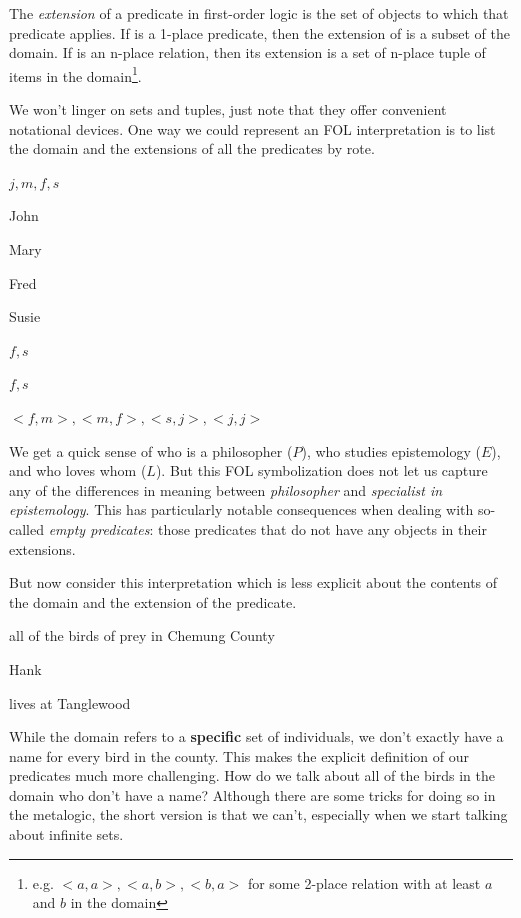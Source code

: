 \begin{definition}
  The \emph{extension} of a predicate in first-order logic is the set
  of objects to which that predicate applies. If \ebeta is a 1-place predicate,
  then the extension of \ebeta is a subset of the domain. If \ebeta is an
  n-place relation, then its extension is a set of n-place tuple of items in
  the domain\footnote{e.g. ${<a,a>,<a,b>,<b,a>}$ for some 2-place relation
  with at least $a$ and $b$ in the domain}.
\end{definition}

We won't linger on sets and tuples, just note that they offer convenient
notational devices. One way we could represent an FOL interpretation is
to list the domain and the extensions of all the predicates by rote.

\begin{argument}
  \item[\textbf{D:}] ${j,m,f,s}$
  \item[$j$:] John
  \item[$m$:] Mary
  \item[$f$:] Fred
  \item[$s$:] Susie
  \item[$P$:] ${f,s}$
  \item[$E$:] ${f,s}$
  \item[$L$:] ${<f,m>,<m,f>,<s,j>,<j,j>}$
\end{argument}

We get a quick sense of who is a philosopher ($P$), who studies epistemology
($E$), and who loves whom ($L$). But this FOL symbolization does not let us
capture any of the differences in meaning between \emph{philosopher} and
\emph{specialist in epistemology}. This has particularly notable consequences
when dealing with so-called \emph{empty predicates}: those predicates that do
not have any objects in their extensions.

But now consider this interpretation which is less explicit about the contents
of the domain and the extension of the predicate.

\begin{argument}
  \item[\textbf{D:}] all of the birds of prey in Chemung County
  \item[$h$:] Hank
  \item[$T$:] lives at Tanglewood
\end{argument}

While the domain refers to a \textbf{specific} set of individuals, we don't
exactly have a name for every bird in the county. This makes the explicit
definition of our predicates much more challenging. How do we talk about all
of the birds in the domain who don't have a name? Although there are some
tricks for doing so in the metalogic, the short version is that we can't,
especially when we start talking about infinite sets.


